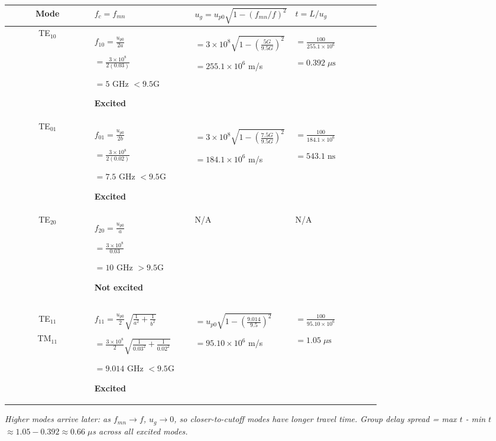 \documentclass[11pt,letterpaper]{article}
\begin{document}
\vspace{4pt}
\renewcommand{\arraystretch}{1.3}
{\centering\begin{tabular}{|c|p{0.27\linewidth}|p{0.27\linewidth}|p{0.23\linewidth}|}
\hline
\textbf{Mode} & \textbf{$f_c = f_{mn}$} & \textbf{$u_g = u_{p0}\sqrt{1-(f_{mn}/f)^2}$} & \textbf{$t = L/u_g$} \\
\hline
\rowcolor{purplebg!40}TE$_{10}$ &
$f_{10} = \tfrac{u_{p0}}{2a}$ \par $= \tfrac{3{\times}10^8}{2(0.03)}$ \par $= 5$ GHz $< 9.5$G \par \textbf{Excited} &
$= 3{\times}10^8\sqrt{1-\left(\tfrac{5G}{9.5G}\right)^{\!2}}$ \par $= 255.1{\times}10^6$ m/s &
$= \tfrac{100}{255.1{\times}10^6}$ \par $\boxed{= 0.392\;\mu\text{s}}$ \\
\hline
TE$_{01}$ &
$f_{01} = \tfrac{u_{p0}}{2b}$ \par $= \tfrac{3{\times}10^8}{2(0.02)}$ \par $= 7.5$ GHz $< 9.5$G \par \textbf{Excited} &
$= 3{\times}10^8\sqrt{1-\left(\tfrac{7.5G}{9.5G}\right)^{\!2}}$ \par $= 184.1{\times}10^6$ m/s &
$= \tfrac{100}{184.1{\times}10^6}$ \par $\boxed{= 543.1\;\text{ns}}$ \\
\hline
\rowcolor{purplebg!40}TE$_{20}$ &
$f_{20} = \tfrac{u_{p0}}{a}$ \par $= \tfrac{3{\times}10^8}{0.03}$ \par $= 10$ GHz $> 9.5$G \par \textbf{Not excited} &
N/A &
N/A \\
\hline
TE$_{11}$ \par TM$_{11}$ &
$f_{11} = \tfrac{u_{p0}}{2}\sqrt{\tfrac{1}{a^2}+\tfrac{1}{b^2}}$ \par $= \tfrac{3{\times}10^8}{2}\sqrt{\tfrac{1}{0.03^2}+\tfrac{1}{0.02^2}}$ \par $= 9.014$ GHz $< 9.5$G \par \textbf{Excited} &
$= u_{p0}\sqrt{1-\left(\tfrac{9.014}{9.5}\right)^{\!2}}$ \par $= 95.10{\times}10^6$ m/s &
$= \tfrac{100}{95.10{\times}10^6}$ \par $\boxed{= 1.05\;\mu\text{s}}$ \\
\hline
\end{tabular}\par}
\renewcommand{\arraystretch}{1.0}

\vspace{4pt}
\textit{Higher modes arrive later: as $f_{mn} \to f$, $u_g \to 0$, so closer-to-cutoff modes have longer travel time. Group delay spread = max $t$ - min $t$ $\approx 1.05 - 0.392 \approx 0.66\;\mu$s across all excited modes.}
\end{document}
